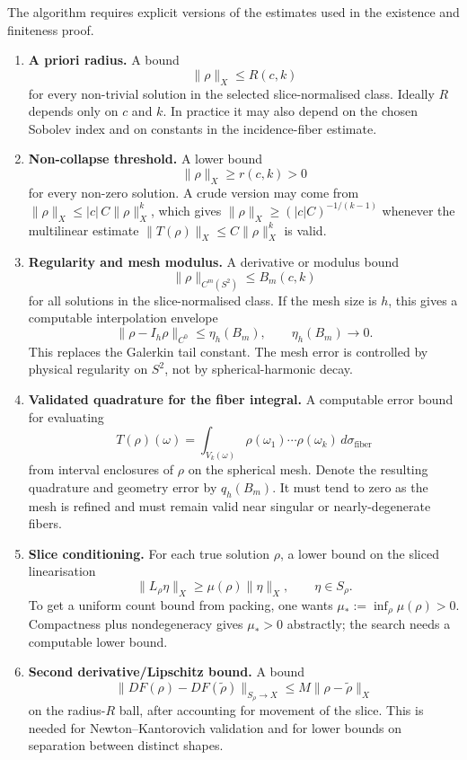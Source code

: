 \documentclass[12pt]{article}
\begin{document}
The algorithm requires explicit versions of the estimates used in the
existence and finiteness proof.
\begin{enumerate}[leftmargin=2em]
  \item \textbf{A priori radius.} A bound
    \[
      \|\rho\|_X\leq R(c,k)
    \]
    for every non-trivial solution in the selected slice-normalised class.
    Ideally $R$ depends only on $c$ and $k$. In practice it may also depend on
    the chosen Sobolev index and on constants in the incidence-fiber estimate.

  \item \textbf{Non-collapse threshold.} A lower bound
    \[
      \|\rho\|_X\geq r(c,k)>0
    \]
    for every non-zero solution. A crude version may come from
    $\|\rho\|_X\leq |c|\,C\|\rho\|_X^k$, which gives
    $\|\rho\|_X\geq (|c|C)^{-1/(k-1)}$ whenever the multilinear estimate
    $\|T(\rho)\|_X\leq C\|\rho\|_X^k$ is valid.

  \item \textbf{Regularity and mesh modulus.} A derivative or modulus bound
    \[
      \|\rho\|_{C^m(S^2)}\leq B_m(c,k)
    \]
    for all solutions in the slice-normalised class. If the mesh size is $h$,
    this gives a computable interpolation envelope
    \[
      \|\rho-I_h\rho\|_{C^0}\leq \eta_h(B_m),
      \qquad \eta_h(B_m)\to0.
    \]
    This replaces the Galerkin tail constant. The mesh error is controlled by
    physical regularity on $S^2$, not by spherical-harmonic decay.

  \item \textbf{Validated quadrature for the fiber integral.} A computable
    error bound for evaluating
    \[
      T(\rho)(\omega)
      =
      \int_{V_k(\omega)}\rho(\omega_1)\cdots\rho(\omega_k)\,
      d\sigma_{\mathrm{fiber}}
    \]
    from interval enclosures of $\rho$ on the spherical mesh. Denote the
    resulting quadrature and geometry error by $q_h(B_m)$. It must tend to zero
    as the mesh is refined and must remain valid near singular or
    nearly-degenerate fibers.


  \item \textbf{Slice conditioning.} For each true solution $\rho$, a lower
    bound on the sliced linearisation
    \[
      \|L_\rho\eta\|_X\geq \mu(\rho)\|\eta\|_X,
      \qquad \eta\in S_\rho.
    \]
    To get a uniform count bound from packing, one wants
    $\mu_*:=\inf_\rho\mu(\rho)>0$. Compactness plus nondegeneracy gives
    $\mu_*>0$ abstractly; the search needs a computable lower bound.

  \item \textbf{Second derivative/Lipschitz bound.} A bound
    \[
      \|DF(\rho)-DF(\tilde\rho)\|_{S_\rho\to X}
      \leq M\|\rho-\tilde\rho\|_X
    \]
    on the radius-$R$ ball, after accounting for movement of the slice. This
    is needed for Newton--Kantorovich validation and for lower bounds on
    separation between distinct shapes.
\end{enumerate}
\end{document}
